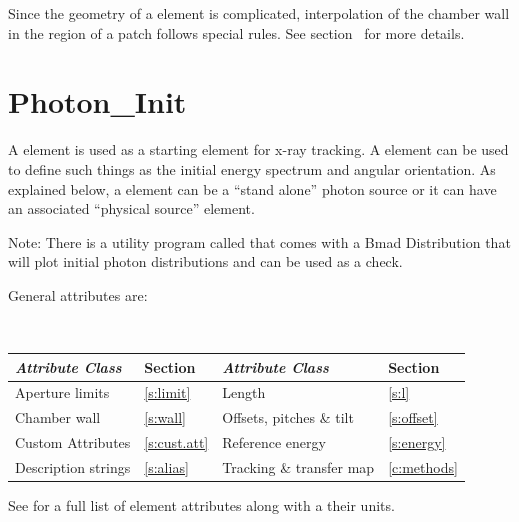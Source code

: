 {
Since the geometry of a  element is complicated, interpolation of the chamber wall in the
region of a patch follows special rules. See section~ for more details.

\newpage

\section{Photon_Init}
\label{s:photon.init}

A  element is used as a starting element for x-ray tracking.  A 
element can be used to define such things as the initial energy spectrum and angular orientation. As
explained below, a  element can be a ``stand alone'' photon source or it can have an
associated ``physical source'' element.

Note: There is a utility program called  that comes with a Bmad Distribution
that will plot initial photon distributions and can be used as a check.

General  attributes are:
\begin{center}
\tt
\begin{tabular}{llll} \toprule
  {\sl Attribute Class}      & Section           & {\sl Attribute Class}      & Section         \\ \midrule
  Aperture limits            & \ref{s:limit}     & Length                     & \ref{s:l}       \\
  Chamber wall               & \ref{s:wall}      & Offsets, pitches \& tilt   & \ref{s:offset}  \\
  Custom Attributes          & \ref{s:cust.att}  & Reference energy           & \ref{s:energy}  \\ 
  Description strings        & \ref{s:alias}     & Tracking \& transfer map   & \ref{c:methods} \\ 
  \bottomrule
\end{tabular}
\end{center}
\toffset
See  for a full list of element attributes along with a their units.

}
